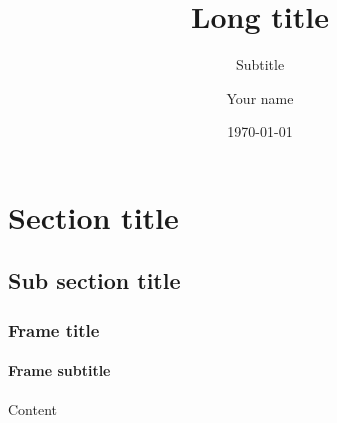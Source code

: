 \documentclass[noamsthm, english]{beamer}
\title[Short title]{Long title}
\subtitle{Subtitle}
\author{Your name}
\institute{Your division\\ 
Your department \\ 
Linköping University}
\date{\today}
\begin{document}
\maketitle
\makeoutline

\section{Section title}
\subsection{Sub section title}

\begin{frame}
\frametitle{Frame title}
\framesubtitle{Frame subtitle}
Content
\end{frame}
\end{document}
